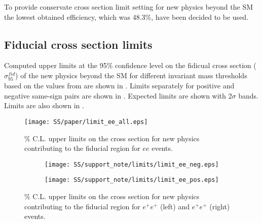 To provide conservate cross section limit setting for new physics beyond the SM the lowest obtained efficiency, which was 48.3$\%$, have been decided to be used.


\subsection{Fiducial cross section limits}

Computed upper limits at the 95$\%$ confidence level on the fidicual cross section ($\sigma_{95}^{fid}$)
of the new physics beyond the SM for different invariant mass thresholds based on the values from 
are shown in . Limits separately for positive and negative same-sign pairs are shown in .
Expected limits are shown with 2$\sigma$ bands. Limits are also shown in .

\begin{figure}[h]
\begin{center}
\texttt{[image: SS/paper/limit\_ee\_all.eps]}
\caption{\% C.L. upper limits on the cross section for new physics contributing to the fiducial region for $ee$ events.}
\label{fig:inclusive_fid_limit}
\end{center}
\end{figure}


\begin{figure}
\begin{subfigure}{.5\textwidth}
  \centering
  \texttt{[image: SS/support\_note/limits/limit\_ee\_neg.eps]}
\end{subfigure}%
\begin{subfigure}{.5\textwidth}
  \centering
  \texttt{[image: SS/support\_note/limits/limit\_ee\_pos.eps]}
\end{subfigure}
\caption{\% C.L. upper limits on the cross section for new physics contributing to the fiducial region 
for $e^{+}e^{+}$ (left) and $e^{+}e^{+}$ (right) events.}
  \label{fig:signal_kinematics}
\end{figure}


